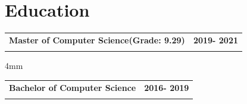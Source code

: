 \documentclass[a4paper,11pt]{article}
\makeatletter
\newcommand{\education}[4]{
\vspace{0mm}\item[]
    \begin{tabular*}{\textwidth}[t]{l@{\extracolsep{\fill}}r}
        \hspace{-4mm} \small\textbf{#1} & {\footnotesize{#3}}\vspace{-1.2mm}\\
        \hspace{-4mm} \footnotesize{\text{#2}} & \footnotesize{#4}
    \end{tabular*}
    \vspace{-5mm}
}
\makeatother
\begin{document}

\section{Education}

\education
{Master of Computer Science(Grade: 9.29)} 
{Mumbai University}
{\textbf{2019- 2021}} 

\vspace{4mm}



\education
{Bachelor of Computer Science} 
{Mumbai University}
{\textbf{2016- 2019}} 
{\textbf{}}




\end{document}

